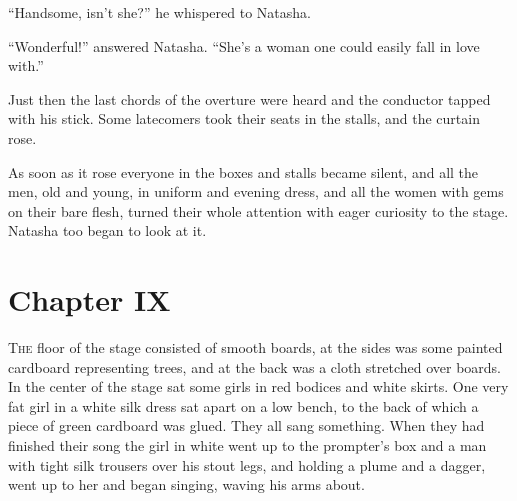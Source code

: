 ``Handsome, isn't she?'' he whispered to Natasha.

``Wonderful!'' answered Natasha. ``She's a woman one could easily
fall in love with.''

Just then the last chords of the overture were heard and the
conductor tapped with his stick. Some latecomers took their seats
in the stalls, and the curtain rose.

As soon as it rose everyone in the boxes and stalls became
silent, and all the men, old and young, in uniform and evening
dress, and all the women with gems on their bare flesh, turned
their whole attention with eager curiosity to the stage. Natasha
too began to look at it.


\chapter*{Chapter IX}
\ifaudio     
{} 
\fi

\lettrine[lines=2, loversize=0.3, lraise=0]{\initfamily T}{he}
floor of the stage consisted of smooth boards, at the sides
was some painted cardboard representing trees, and at the back
was a cloth stretched over boards. In the center of the stage sat
some girls in red bodices and white skirts. One very fat girl in
a white silk dress sat apart on a low bench, to the back of which
a piece of green cardboard was glued. They all sang
something. When they had finished their song the girl in white
went up to the prompter's box and a man with tight silk trousers
over his stout legs, and holding a plume and a dagger, went up to
her and began singing, waving his arms about.

